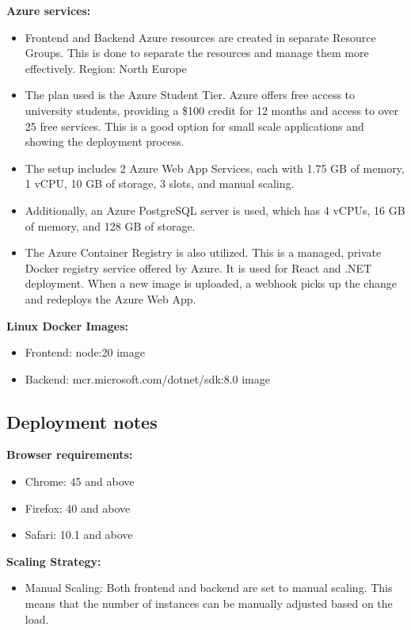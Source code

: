 \documentclass[
    english, %
]{VUMIFPSkursinis}
\begin{document}
\textbf{Azure services:}
\begin{itemize}
    \item Frontend and Backend Azure resources are created in separate Resource Groups. This is done to separate the resources and manage them more effectively. Region: North Europe
    \item The plan used is the Azure Student Tier. Azure offers free access to university students, providing a \$100 credit for 12 months and access to over 25 free services. This is a good option for small scale applications and showing the deployment process. 
    \item The setup includes 2 Azure Web App Services, each with 1.75 GB of memory, 1 vCPU, 10 GB of storage, 3 slots, and manual scaling. 
    \item Additionally, an Azure PostgreSQL server is used, which has 4 vCPUs, 16 GB of memory, and 128 GB of storage. 
    \item The Azure Container Registry is also utilized. This is a managed, private Docker registry service offered by Azure. It is used for React and .NET deployment. When a new image is uploaded, a webhook picks up the change and redeploys the Azure Web App.
\end{itemize}

\textbf{Linux Docker Images:}
\begin{itemize}
    \item Frontend: node:20 image
    \item Backend: mcr.microsoft.com/dotnet/sdk:8.0 image
\end{itemize}

\subsection{Deployment notes}

\textbf{Browser requirements:}
\begin{itemize}
    \item Chrome: 45 and above
    \item Firefox: 40 and above
    \item Safari: 10.1 and above
\end{itemize}

\textbf{Scaling Strategy:}
\begin{itemize}
    \item Manual Scaling: Both frontend and backend are set to manual scaling. This means that the number of instances can be manually adjusted based on the load.
\end{itemize}
\end{document}
